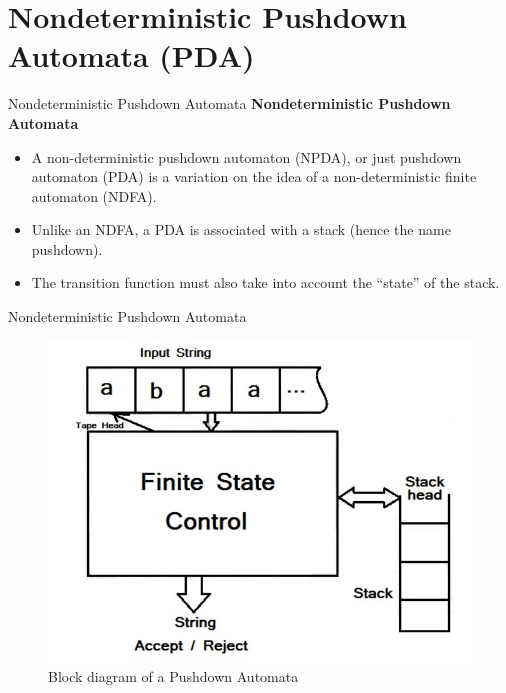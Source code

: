\documentclass{beamer}
\begin{document}
\section{Nondeterministic Pushdown Automata (PDA)}
\begin{frame}{Nondeterministic Pushdown Automata}
\textbf{Nondeterministic Pushdown Automata}
\begin{itemize}
	\item A non-deterministic pushdown automaton (NPDA), or just pushdown automaton (PDA) is a variation on the idea of a non-deterministic finite automaton (NDFA).
	\item Unlike an NDFA, a PDA is associated with a stack (hence the name pushdown).
	\item The transition function must also take into account the “state” of the stack.
\end{itemize}
\end{frame}	
\begin{frame}{Nondeterministic Pushdown Automata}
\begin{figure}
	\includegraphics[scale=.7]{img4/m1}
	\caption{Block diagram of a Pushdown Automata}
\end{figure}
\end{frame}	
\end{document}
